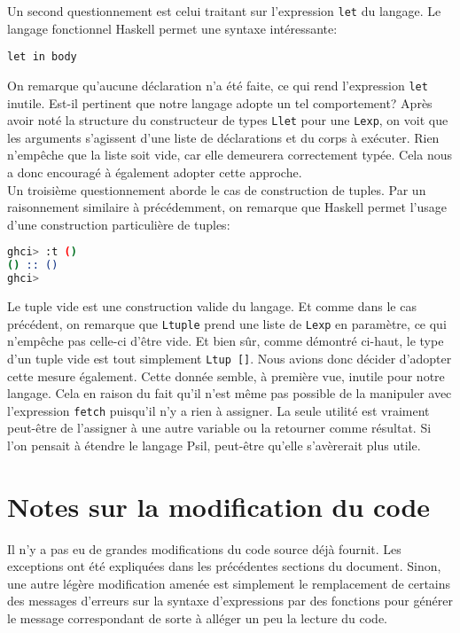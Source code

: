\documentclass[11pt, titlepage]{article}
\begin{document}
Un second questionnement est celui traitant sur l'expression \texttt{let} du
langage. Le langage fonctionnel Haskell permet une syntaxe intéressante:
\begin{lstlisting}
let in body
\end{lstlisting}
On remarque qu'aucune déclaration n'a été faite, ce qui rend l'expression
\texttt{let} inutile. Est-il pertinent que notre langage adopte un tel 
comportement? Après avoir noté la structure du constructeur de types
\texttt{Llet} pour une \texttt{Lexp}, on voit que les arguments s'agissent
d'une liste de déclarations et du corps à exécuter. Rien n'empêche que la liste
soit vide, car elle demeurera correctement typée. Cela nous a donc encouragé à
également adopter cette approche. \\

Un troisième questionnement aborde le cas de construction de tuples. Par un
raisonnement similaire à précédemment, on remarque que Haskell permet l'usage
d'une construction particulière de tuples:
\begin{lstlisting}[language=bash]
ghci> :t ()
() :: ()
ghci>
\end{lstlisting}
Le tuple vide est une construction valide du langage. Et comme dans le cas
précédent, on remarque que \texttt{Ltuple} prend une liste de \texttt{Lexp} en
paramètre, ce qui n'empêche pas celle-ci d'être vide. Et bien sûr, comme
démontré ci-haut, le type d'un tuple vide est tout simplement \texttt{Ltup []}.
Nous avions donc décider d'adopter cette mesure également. Cette donnée semble,
à première vue, inutile pour notre langage. Cela en raison du fait qu'il n'est
même pas possible de la manipuler avec l'expression \texttt{fetch} puisqu'il
n'y a rien à assigner. La seule utilité est vraiment peut-être de l'assigner à
une autre variable ou la retourner comme résultat. Si l'on pensait à étendre
le langage Psil, peut-être qu'elle s'avèrerait plus utile.

\section{Notes sur la modification du code}

Il n'y a pas eu de grandes modifications du code source déjà fournit. Les
exceptions ont été expliquées dans les précédentes sections du document. Sinon,
une autre légère modification amenée est simplement le remplacement de certains
des messages d'erreurs sur la syntaxe d'expressions par des fonctions pour
générer le message correspondant de sorte à alléger un peu la lecture du code.
\end{document}
